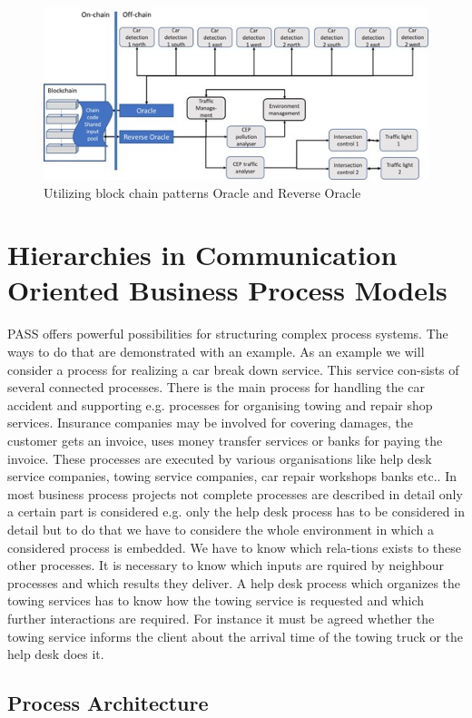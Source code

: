 \begin{figure}
	\centering
	\includegraphics[width=0.7\linewidth]{Figures/Chapter5/figuresshared/Block-Chain.jpg}
	\caption[Utilizing block chain patterns Oracle and Reverse Oracle]{Utilizing block chain patterns Oracle and Reverse Oracle}
	\label{fig:sharedblockchain}
\end{figure}


\section{Hierarchies in Communication Oriented Business Process Models}
PASS  offers powerful possibilities for structuring complex process systems. The ways to do that are demonstrated with an example.
As an example we will consider a process for realizing a car break down service. This service con-sists of several connected processes. There is the main process for handling the car accident and supporting e.g. processes for organising towing and repair shop services. Insurance companies may be involved for covering damages, the customer gets an invoice, uses money transfer services or banks for paying the invoice. These processes are executed by various organisations like help desk service companies, towing service companies, car repair workshops banks etc.. In most business process projects not complete processes are described in detail only a certain part is considered e.g. only the help desk process has to be considered in detail but to do that we have to considere the whole environment in which a considered process is embedded. We have to know which rela-tions exists to these other processes. It is necessary to know which inputs are rquired by neighbour processes and which results they deliver. A help desk process which organizes the towing services has to know how the towing service is requested and which further interactions are required. For instance it must be agreed whether the towing service informs the client about the arrival time of the towing truck or the help desk does it.


\subsection{Process Architecture}

